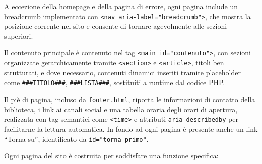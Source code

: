 \documentclass{article}
\begin{document}
A eccezione della homepage e della pagina di errore, ogni pagina include un breadcrumb implementato con \texttt{<nav aria-label="breadcrumb">}, che mostra la posizione corrente nel sito e consente di tornare agevolmente alle sezioni superiori.

Il contenuto principale è contenuto nel tag \texttt{<main id="contenuto">}, con sezioni organizzate gerarchicamente tramite \texttt{<section>} e \texttt{<article>}, titoli ben strutturati, e dove necessario, contenuti dinamici inseriti tramite placeholder come \texttt{\#\#\#TITOLO\#\#\#}, \texttt{\#\#\#LISTA\#\#\#}, sostituiti a runtime dal codice PHP.

Il piè di pagina, incluso da \texttt{footer.html}, riporta le informazioni di contatto della biblioteca, i link ai canali social e una tabella oraria degli orari di apertura, realizzata con tag semantici come \texttt{<time>} e attributi \texttt{aria-describedby} per facilitarne la lettura automatica.  
In fondo ad ogni pagina è presente anche un link “Torna su”, identificato da \texttt{id="torna-primo"}.

\medskip

Ogni pagina del sito è costruita per soddisfare una funzione specifica:
\end{document}
